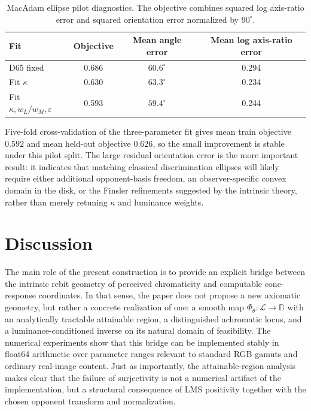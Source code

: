 \documentclass[11pt]{article}
\theoremstyle{plain}
\theoremstyle{definition}
\theoremstyle{remark}
\begin{document}
\begin{table}[H]
\centering
\caption{MacAdam ellipse pilot diagnostics. The objective combines squared log axis-ratio error and squared orientation error normalized by $90^\circ$.}
\label{tab:macadam-pilot}
\begin{tabular}{@{}lccc@{}}
\toprule
\textbf{Fit} & \textbf{Objective} & \textbf{Mean angle error} & \textbf{Mean log axis-ratio error} \\
\midrule
D65 fixed & 0.686 & $60.6^\circ$ & 0.294 \\
Fit $\kappa$ & 0.630 & $63.3^\circ$ & 0.234 \\
Fit $\kappa,w_L/w_M,\varepsilon$ & 0.593 & $59.4^\circ$ & 0.244 \\
\bottomrule
\end{tabular}
\end{table}

Five-fold cross-validation of the three-parameter fit gives mean train objective $0.592$ and mean held-out objective $0.626$, so the small improvement is stable under this pilot split. The large residual orientation error is the more important result: it indicates that matching classical discrimination ellipses will likely require either additional opponent-basis freedom, an observer-specific convex domain in the disk, or the Finsler refinements suggested by the intrinsic theory, rather than merely retuning $\kappa$ and luminance weights.

\section{Discussion}
\label{sec:discussion}

The main role of the present construction is to provide an explicit bridge between the intrinsic rebit geometry of perceived chromaticity and computable cone-response coordinates. In that sense, the paper does not propose a new axiomatic geometry, but rather a concrete realization of one: a smooth map $\Phi_\theta \colon \mathcal{L} \to \mathbb{D}$ with an analytically tractable attainable region, a distinguished achromatic locus, and a luminance-conditioned inverse on its natural domain of feasibility. The numerical experiments show that this bridge can be implemented stably in float64 arithmetic over parameter ranges relevant to standard RGB gamuts and ordinary real-image content. Just as importantly, the attainable-region analysis makes clear that the failure of surjectivity is not a numerical artifact of the implementation, but a structural consequence of LMS positivity together with the chosen opponent transform and normalization.
\end{document}
